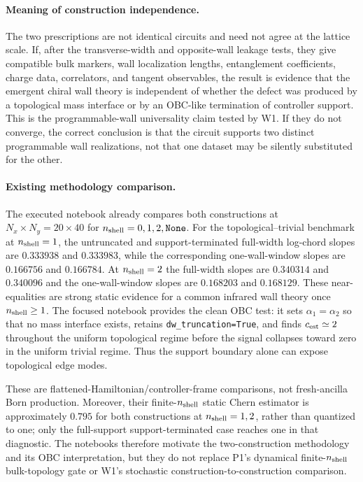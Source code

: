 \documentclass[aps,prx,twocolumn,floatfix,nofootinbib,superscriptaddress,longbibliography]{revtex4-2}
\newcommand{\code}[1]{\texttt{#1}}
\begin{document}
\paragraph*{Meaning of construction independence.}
The two prescriptions are not identical circuits and need not agree at the lattice scale.
If, after the transverse-width and opposite-wall leakage tests, they give compatible bulk
markers, wall localization lengths, entanglement coefficients, charge data, correlators,
and tangent observables, the result is evidence that the emergent chiral wall theory is
independent of whether the defect was produced by a topological mass interface or by an
OBC-like termination of controller support.  This is the programmable-wall universality
claim tested by W1.  If they do not converge, the correct conclusion is that the circuit
supports two distinct programmable wall realizations, not that one dataset may be silently
substituted for the other.

\paragraph*{Existing methodology comparison.}
The executed notebook
already compares both constructions at $N_x\times N_y=20\times40$ for
$n_{\rm shell}=0,1,2,\texttt{None}$.  For the topological--trivial benchmark at
$n_{\rm shell}=1$, the untruncated and support-terminated full-width log-chord slopes are
$0.333938$ and $0.333983$, while the corresponding one-wall-window slopes are $0.166756$
and $0.166784$.  At $n_{\rm shell}=2$ the full-width slopes are $0.340314$ and $0.340096$
and the one-wall-window slopes are $0.168203$ and $0.168129$.  These near-equalities are
strong static evidence for a common infrared wall theory once $n_{\rm shell}\geq1$.
The focused notebook
provides the clean OBC test: it sets $\alpha_1=\alpha_2$ so that no mass interface exists,
retains \code{dw\_truncation=True}, and finds $c_{\rm est}\simeq2$ throughout the uniform
topological regime before the signal collapses toward zero in the uniform trivial regime.
Thus the support boundary alone can expose topological edge modes.

These are flattened-Hamiltonian/controller-frame comparisons, not fresh-ancilla Born
production.  Moreover, their finite-$n_{\rm shell}$ static Chern estimator is approximately
$0.795$ for both constructions at $n_{\rm shell}=1,2$, rather than quantized to one; only
the full-support support-terminated case reaches one in that diagnostic.  The notebooks
therefore motivate the two-construction methodology and its OBC interpretation, but they
do not replace P1's dynamical finite-$n_{\rm shell}$ bulk-topology gate or W1's stochastic
construction-to-construction comparison.
\end{document}
